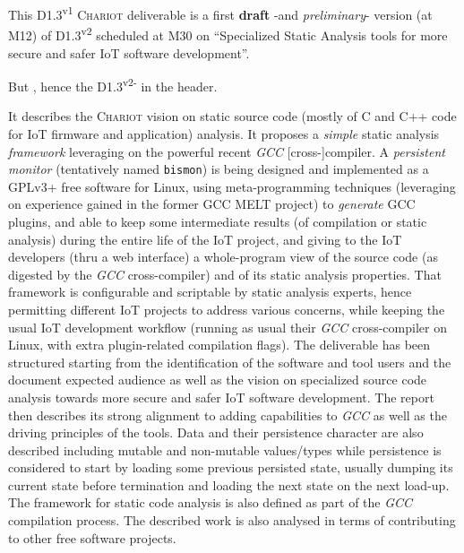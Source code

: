 \documentclass[11pt,a4paper,svgnames]{article}
\begin{document}
\begin{titlepage}
  This D1.3\textsuperscript{v1} \textsc{Chariot} deliverable is
  {\color{red}{(was)}} a first \textbf{draft} -and \emph{preliminary}-
  version (at M12) of D1.3\textsuperscript{v2} scheduled at M30 on
  ``Specialized Static Analysis tools for more secure and safer IoT
  software development''.

But {}, hence the
D1.3\textsuperscript{v2-} in the header.

It describes the \textsc{Chariot} vision on static source code (mostly
of C and C++ code for IoT firmware and application) analysis. It
proposes a \emph{simple} static analysis \emph{framework} leveraging
on the powerful recent \emph{GCC} [cross-]compiler. A \emph{persistent
  monitor} (tentatively named \texttt{bismon}) is being designed and
implemented as a GPLv3+ free software for Linux, using
meta-programming techniques (leveraging on experience gained in the
former GCC MELT project) to \emph{generate} GCC plugins, and able to
keep some intermediate results (of compilation or static analysis)
during the entire life of the IoT project, and giving to the IoT
developers (thru a web interface) a whole-program view of the source
code (as digested by the \emph{GCC} cross-compiler) and of its static
analysis properties. That framework is configurable and scriptable by
static analysis experts, hence permitting different IoT projects to
address various concerns, while keeping the usual IoT development
workflow (running as usual their \emph{GCC} cross-compiler on Linux,
with extra plugin-related compilation flags).  The deliverable has
been structured starting from the identification of the software and
tool users and the document expected audience as well as the vision on
specialized source code analysis towards more secure and safer IoT
software development. The report then describes its strong alignment
to adding capabilities to \emph{GCC} as well as the driving principles of the
tools. Data and their persistence character are also described
including mutable and non-mutable values/types while persistence is
considered to start by loading some previous persisted state, usually
dumping its current state before termination and loading the next
state on the next load-up. The framework for static code analysis is
also defined as part of the \emph{GCC} compilation process. The described
work is also analysed in terms of contributing to other free software
projects.

\medskip


\end{titlepage}
\end{document}
